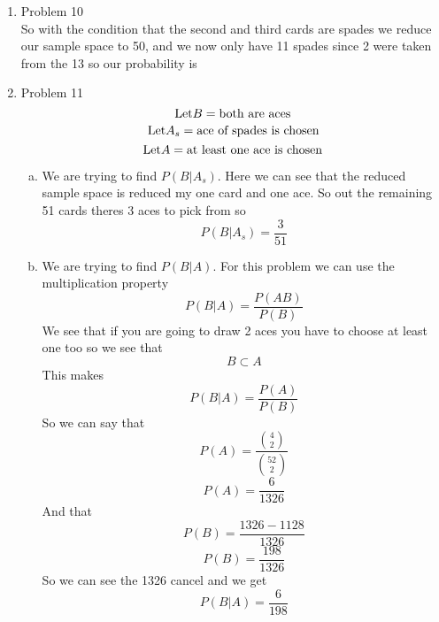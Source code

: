 \documentclass[11pt]{article}
\begin{document}
\begin{enumerate}
\item Problem 10\\
So with the condition that the second and third cards are spades we reduce our sample space to 50, and we now only have 11 spades since 2 were taken from the 13 so our probability is
\begin{center}
\end{center}

\item Problem 11
$$\textnormal{Let} B = \textnormal{both are aces}$$
$$\textnormal{Let} A_s = \textnormal{ace of spades is chosen}$$
$$\textnormal{Let} A = \textnormal{at least one ace is chosen}$$
\begin{enumerate}[(a)]
\item We are trying to find $P(B|A_s)$. Here we can see that the reduced sample space is reduced my one card and one ace. So out the remaining 51 cards theres 3 aces to pick from so
$$P(B|A_s) = \frac{3}{51}$$
\begin{center}
\end{center}

\item We are trying to find $P(B|A)$. For this problem we can use the multiplication property 
$$P(B|A)=\frac{P(AB)}{P(B)}$$
We see that if you are going to draw 2 aces you have to choose at least one too so we see that 
$$B\subset A$$
This makes 
$$P(B|A)=\frac{P(A)}{P(B)}$$
So we can say that
$$P(A) = \frac{{4\choose2}}{{52\choose2}}$$
$$P(A) = \frac{6}{1326}$$
And that
$$P(B) = \frac{1326-1128}{1326}$$
$$P(B) = \frac{198}{1326}$$
So we can see the 1326 cancel and we get
$$P(B|A)=\frac{6}{198}$$
\begin{center}
\end{center}
\end{enumerate}
\end{enumerate}
\end{document}
